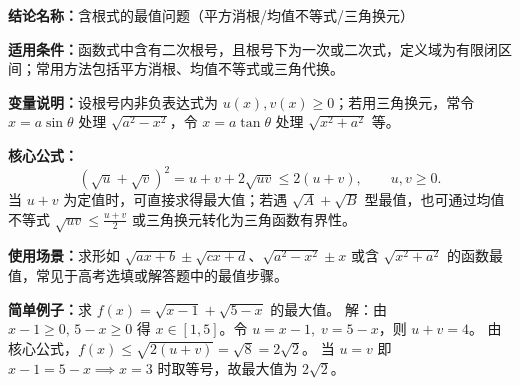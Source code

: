 \textbf{结论名称：}含根式的最值问题（平方消根/均值不等式/三角换元）

\textbf{适用条件：}函数式中含有二次根号，且根号下为一次或二次式，定义域为有限闭区间；常用方法包括平方消根、均值不等式或三角代换。

\textbf{变量说明：}设根号内非负表达式为 $u(x),v(x)\ge0$；若用三角换元，常令 $x=a\sin\theta$ 处理 $\sqrt{a^{2}-x^{2}}$，令 $x=a\tan\theta$ 处理 $\sqrt{x^{2}+a^{2}}$ 等。

\textbf{核心公式：}
\[
\boxed{(\sqrt{u}+\sqrt{v})^{2}=u+v+2\sqrt{uv}\le 2(u+v),\qquad u,v\ge0.}
\]
当 $u+v$ 为定值时，可直接求得最大值；若遇 $\sqrt{A}+\sqrt{B}$ 型最值，也可通过均值不等式 $\sqrt{uv}\le\frac{u+v}{2}$ 或三角换元转化为三角函数有界性。

\textbf{使用场景：}求形如 $\sqrt{ax+b}\pm\sqrt{cx+d}$、$\sqrt{a^{2}-x^{2}}\pm x$ 或含 $\sqrt{x^{2}+a^{2}}$ 的函数最值，常见于高考选填或解答题中的最值步骤。

\textbf{简单例子：}求 $f(x)=\sqrt{x-1}+\sqrt{5-x}$ 的最大值。
解：由 $x-1\ge0,\,5-x\ge0$ 得 $x\in[1,5]$。令 $u=x-1,\;v=5-x$，则 $u+v=4$。
由核心公式，$f(x)\le\sqrt{2(u+v)}=\sqrt{8}=2\sqrt{2}$。
当 $u=v$ 即 $x-1=5-x\implies x=3$ 时取等号，故最大值为 $2\sqrt{2}$。